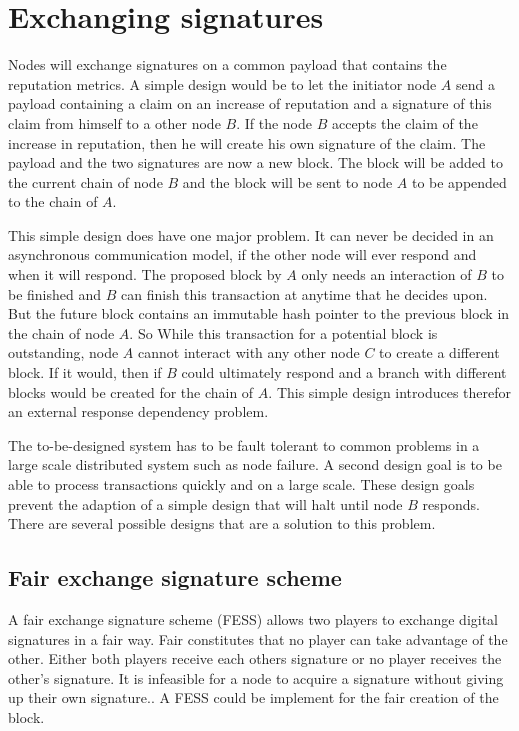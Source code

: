\section{Exchanging signatures}
Nodes will exchange signatures on a common payload that contains the reputation metrics.
A simple design would be to let the initiator node $A$ send a payload containing a claim on an increase of reputation and a signature of this claim from himself to a other node $B$.
If the node $B$ accepts the claim of the increase in reputation,
then he will create his own signature of the claim.
The payload and the two signatures are now a new block.
The block will be added to the current chain of node $B$ 
and the block will be sent to node $A$ to be appended to the chain of $A$.

This simple design does have one major problem.
It can never be decided in an asynchronous communication model,
if the other node will ever respond and when it will respond.
The proposed block by $A$ only needs an interaction of $B$ to be finished
and $B$ can finish this transaction at anytime that he decides upon.
But the future block contains an immutable hash pointer
to the previous block in the chain of node $A$.
So While this transaction for a potential block is outstanding, 
node $A$ cannot interact with any other node $C$ to create a different block.
If it would, then if $B$ could ultimately respond and a branch with different blocks
would be created for the chain of $A$.
This simple design introduces therefor an external response dependency problem.

The to-be-designed system has to be fault tolerant to 
common problems in a large scale distributed system such as node failure.
A second design goal is to be able to process transactions quickly and on a large scale.
These design goals prevent the adaption of a simple design that will halt until node $B$ responds.
There are several possible designs that are a solution to this problem.

\subsection{Fair exchange signature scheme}
A fair exchange signature scheme (FESS) allows two players to exchange digital signatures in a fair way.
Fair constitutes that no player can take advantage of the other.
Either both players receive each others signature or no player receives the other's signature.
It is infeasible for a node to acquire a signature without giving up their own signature.\cite{asokan-fairexchange}.
A FESS could be implement for the fair creation of the block.

